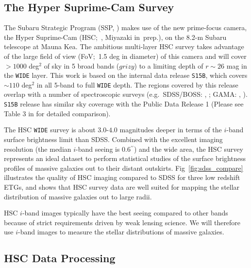 \documentclass[a4paper,fleqn,usenatbib]{mnras}
\def\asec{$^{\prime\prime}$}
\begin{document}
\subsection{The Hyper Suprime-Cam Survey}
    \label{ssec:hsc}

    The Subaru Strategic Program (SSP, \citealt{HSC-SSP, HSC-DR1}) makes use of the 
    new prime-focus camera, the Hyper Suprime-Cam (HSC;~\citealt{Miyazaki2012}, 
    Miyazaki in~prep.), on the 
    8.2-m Subaru telescope at Mauna Kea. 
    The ambitious multi-layer HSC survey takes advantage of the large field of 
    view (FoV;~1.5 deg in diameter) of this camera and will cover $>1000$ deg$^2$ 
    of sky in 5 broad bands ($grizy$) to a limiting depth of $r {\sim} 26$ mag 
    in the \texttt{WIDE} layer. 
    This work is based on the internal data release \texttt{S15B}, which covers 
    ${\sim} 110$ deg$^2$ in all 5-band to full \texttt{WIDE} depth.  
    The regions covered by this release overlap with a number of spectroscopic surveys 
    (e.g.\ SDSS/BOSS: \citealt{Eisenstein2011}, \citealt{SDSS-DR12}; 
    GAMA: \citealt{Driver2011}, \citealt{Liske2015}).
    \texttt{S15B} release has similar sky coverage with the Public Data Release 1
    (Please see Table 3 in \citealt{HSC-DR1} for detailed comparison).

    The HSC \texttt{WIDE} survey is about $3.0$-$4.0$ magnitudes deeper in terms of 
    the $i$-band surface brightness limit than SDSS. 
    Combined with the excellent imaging resolution (the median $i$-band seeing is 
    0.6\asec) and the wide area, the HSC survey represents an ideal dataset to perform 
    statistical studies of the surface brightness profiles of massive galaxies out to 
    their distant outskirts.  
    Fig~\ref{fig:sdss_compare} illustrates the quality of HSC imaging compared to SDSS 
    for three low redshift ETGs, and shows that HSC survey data are well suited for 
    mapping the stellar distribution of massive galaxies out to large radii.

	HSC $i$-band images typically have the best seeing compared to other bands because 
	of strict requirements driven by weak lensing science. 
    We will therefore use $i$-band images to measure the stellar distributions of 
    massive galaxies.
    
\subsection{HSC Data Processing}
    \label{sec:pipeline}
\end{document}
